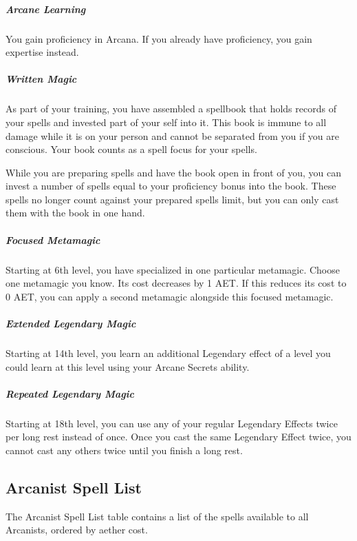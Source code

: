 \subparagraph*{Arcane Learning}
You gain proficiency in Arcana. If you already have proficiency, you gain expertise instead.

\subparagraph*{Written Magic}
As part of your training, you have assembled a spellbook that holds records of your spells and invested part of your self into it. This book is immune to all damage while it is on your person and cannot be separated from you if you are conscious. Your book counts as a spell focus for your spells.

While you are preparing spells and have the book open in front of you, you can invest a number of spells equal to your proficiency bonus into the book. These spells no longer count against your prepared spells limit, but you can only cast them with the book in one hand.

\subparagraph*{Focused Metamagic}
Starting at 6th level, you have specialized in one particular metamagic. Choose one metamagic you know. Its cost decreases by 1 AET. If this reduces its cost to 0 AET, you can apply a second metamagic alongside this focused metamagic.

\subparagraph*{Extended Legendary Magic}
Starting at 14th level, you learn an additional Legendary effect of a level you could learn at this level using your Arcane Secrets ability.

\subparagraph*{Repeated Legendary Magic}
Starting at 18th level, you can use any of your regular Legendary Effects twice per long rest instead of once. Once you cast the same Legendary Effect twice, you cannot cast any others twice until you finish a long rest.

\subsection{Arcanist Spell List}
The Arcanist Spell List table contains a list of the spells available to all Arcanists, ordered by aether cost.

